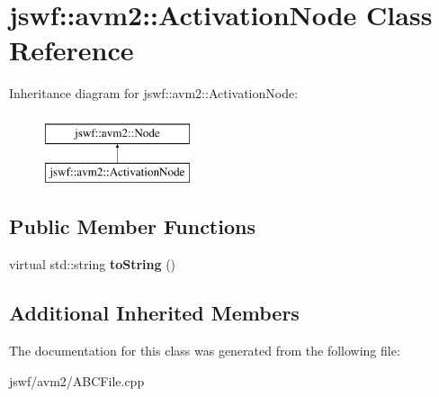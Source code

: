 \hypertarget{classjswf_1_1avm2_1_1_activation_node}{\section{jswf\+:\+:avm2\+:\+:Activation\+Node Class Reference}
\label{classjswf_1_1avm2_1_1_activation_node}
}
Inheritance diagram for jswf\+:\+:avm2\+:\+:Activation\+Node\+:\begin{figure}[H]
\begin{center}
\leavevmode
\includegraphics[height=2.000000cm]{classjswf_1_1avm2_1_1_activation_node}
\end{center}
\end{figure}
\subsection*{Public Member Functions}
\begin{DoxyCompactItemize}
\item 
\hypertarget{classjswf_1_1avm2_1_1_activation_node_af09243188ca071a408bc96659564ce3a}{virtual std\+::string {\bfseries to\+String} ()}\label{classjswf_1_1avm2_1_1_activation_node_af09243188ca071a408bc96659564ce3a}

\end{DoxyCompactItemize}
\subsection*{Additional Inherited Members}


The documentation for this class was generated from the following file\+:\begin{DoxyCompactItemize}
\item 
jswf/avm2/A\+B\+C\+File.\+cpp\end{DoxyCompactItemize}
